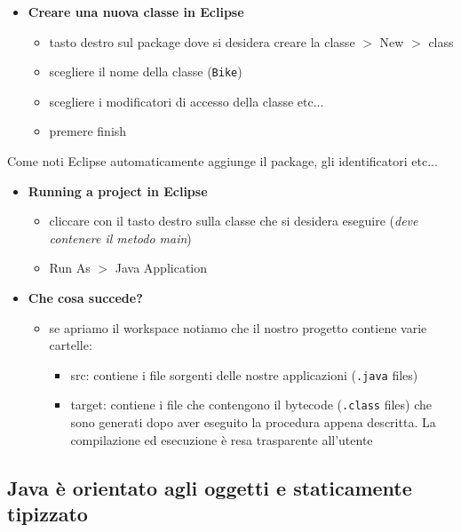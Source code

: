 \documentclass{article}
\theoremstyle{definition}
\begin{document}
\begin{itemize}
\item \textbf{Creare una nuova classe in Eclipse}
\begin{itemize}
\item tasto destro sul package dove si desidera creare la classe  $>$ New $>$ class 
\item scegliere il nome della classe (\texttt{Bike})
\item scegliere i modificatori di accesso della classe etc...
\item premere finish
\end{itemize}
\end{itemize}
Come noti  Eclipse automaticamente aggiunge il package, gli identificatori etc...

\begin{itemize}
\item \textbf{Running a project in Eclipse}
\begin{itemize}
\item cliccare con il tasto destro sulla classe che si desidera eseguire (\emph{deve contenere il metodo  main})
\item Run As $>$ Java Application
\end{itemize}
\end{itemize}

\begin{itemize}
\item \textbf{Che cosa succede?}
\begin{itemize}
\item se apriamo il workspace notiamo che il nostro progetto contiene varie cartelle: 
\begin{itemize}
\item src: contiene i file sorgenti delle nostre applicazioni (\texttt{.java} files)
\item target: contiene i file che contengono il bytecode (\texttt{.class} files) che sono generati dopo aver eseguito la procedura appena descritta. La compilazione ed esecuzione \`e resa trasparente all'utente
\end{itemize}
\end{itemize}
\end{itemize}

\subsection{Java \`e orientato agli oggetti e staticamente tipizzato}
\end{document}
